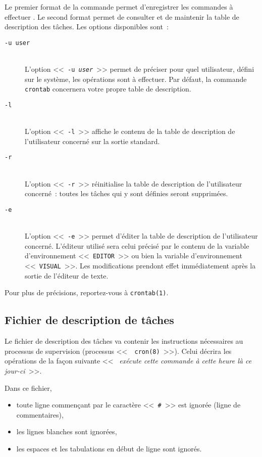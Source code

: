 Le premier format de la commande permet d'enregistrer les commandes {\`a} effectuer .
Le second format permet de consulter et de maintenir la table de description des
t{\^a}ches.
Les options disponibles sont~:
\begin{description}
	\item[{\tt -u user}]\mbox{}\\
		L'option <<~{\tt -u {\sl user}}~>> permet de pr{\'e}ciser pour  quel utilisateur, d{\'e}fini
		sur le syst{\`e}me, les op{\'e}rations sont {\`a} effectuer. Par d{\'e}faut, la commande
		{\tt crontab} concernera votre propre table de description.

	\item[{\tt -l}]\mbox{}\\
		L'option <<~{\tt -l}~>> affiche le contenu de la table de description de
		l'utilisateur concern{\'e} sur la sortie standard.

	\item[{\tt -r}]\mbox{}\\
		L'option <<~{\tt -r}~>> r{\'e}initialise la table de description de l'utilisateur
		concern{\'e}~: toutes les t{\^a}ches qui y sont d{\'e}finies seront supprim{\'e}es.

	\item[{\tt -e}]\mbox{}\\
		L'option <<~{\tt -e}~>> permet d'{\'e}diter la table de description de l'utilisateur
		concern{\'e}. L'{\'e}diteur utilis{\'e} sera celui pr{\'e}cis{\'e} par le contenu de la variable
		d'environnement <<~{\tt EDITOR}~>> ou bien la variable d'environnement
		<<~{\tt VISUAL}~>>. Les modifications prendont effet imm{\'e}diatement apr{\`e}s la sortie
		de l'{\'e}diteur de texte.
\end{description}

Pour plus de pr{\'e}cisions, reportez-vous {\`a} {\tt crontab(1)}.

\subsection{Fichier de description de t{\^a}ches}

Le fichier de description des t{\^a}ches va contenir les instructions
n{\'e}cessaires au processus de supervision (processus <<~{\tt
cron(8)}~>>). Celui d{\'e}crira les op{\'e}rations de la fa\c{c}on suivante <<~{\sl
ex{\'e}cute cette commande {\`a} cette heure l{\`a} ce jour-ci}~>>.

Dans ce fichier,
\begin{itemize}
	\item	toute ligne commen\c{c}ant par le caract{\`e}re <<~\verb=#=~>> est ignor{\'e}e (ligne
			de commentaires),
	\item	les lignes blanches sont ignor{\'e}es,
	\item	les espaces et les tabulations en d{\'e}but de ligne sont ignor{\'e}s.
\end{itemize}

